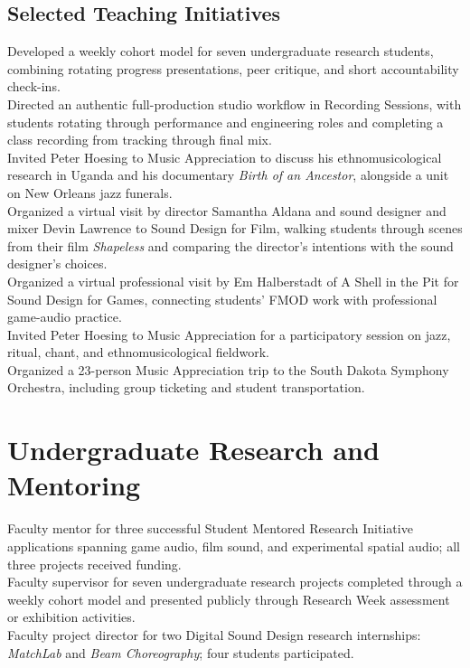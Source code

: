 \documentclass[12pt, a4paper]{article}
\newcommand{\years}[1]{\leavevmode\marginnote{\scriptsize #1}\ignorespaces}%
\begin{document}
\subsection*{Selected Teaching Initiatives}
\years{2026} Developed a weekly cohort model for seven undergraduate research students, combining rotating progress presentations, peer critique, and short accountability check-ins.\\
Directed an authentic full-production studio workflow in Recording Sessions, with students rotating through performance and engineering roles and completing a class recording from tracking through final mix.\\
Invited Peter Hoesing to Music Appreciation to discuss his ethnomusicological research in Uganda and his documentary \textit{Birth of an Ancestor}, alongside a unit on New Orleans jazz funerals.\\
Organized a virtual visit by director Samantha Aldana and sound designer and mixer Devin Lawrence to Sound Design for Film, walking students through scenes from their film \textit{Shapeless} and comparing the director's intentions with the sound designer's choices.\\
\years{2025} Organized a virtual professional visit by Em Halberstadt of A Shell in the Pit for Sound Design for Games, connecting students' FMOD work with professional game-audio practice.\\
Invited Peter Hoesing to Music Appreciation for a participatory session on jazz, ritual, chant, and ethnomusicological fieldwork.\\
Organized a 23-person Music Appreciation trip to the South Dakota Symphony Orchestra, including group ticketing and student transportation.

\section*{Undergraduate Research and Mentoring}
\years{2025--26} Faculty mentor for three successful Student Mentored Research Initiative applications spanning game audio, film sound, and experimental spatial audio; all three projects received funding.\\
\years{2026} Faculty supervisor for seven undergraduate research projects completed through a weekly cohort model and presented publicly through Research Week assessment or exhibition activities.\\
Faculty project director for two Digital Sound Design research internships: \textit{MatchLab} and \textit{Beam Choreography}; four students participated.
\end{document}
